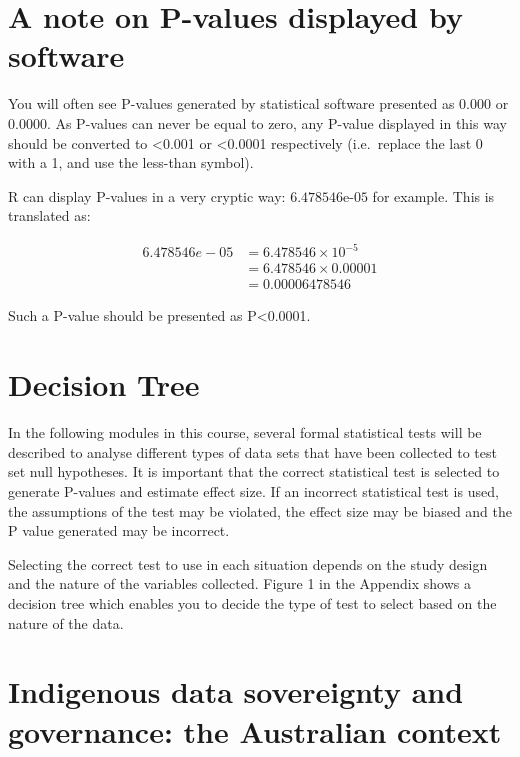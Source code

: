 \documentclass[
  a4paper,
]{memoir}
\begin{document}
\section{A note on P-values displayed by
software}\label{a-note-on-p-values-displayed-by-software}

You will often see P-values generated by statistical software presented
as 0.000 or 0.0000. As P-values can never be equal to zero, any P-value
displayed in this way should be converted to \textless0.001 or
\textless0.0001 respectively (i.e.~replace the last 0 with a 1, and use
the less-than symbol).

R can display P-values in a very cryptic way: \(\text{6.478546e-05}\)
for example. This is translated as:

\[\begin{aligned}
6.478546e-05 &= 6.478546 \times 10^{-5} \\
  &= 6.478546 \times 0.00001 \\
  &= 0.00006478546
\end{aligned}\]

Such a P-value should be presented as P\textless0.0001.

\section{Decision Tree}\label{decision-tree}

In the following modules in this course, several formal statistical
tests will be described to analyse different types of data sets that
have been collected to test set null hypotheses. It is important that
the correct statistical test is selected to generate P-values and
estimate effect size. If an incorrect statistical test is used, the
assumptions of the test may be violated, the effect size may be biased
and the P value generated may be incorrect.

Selecting the correct test to use in each situation depends on the study
design and the nature of the variables collected. Figure 1 in the
Appendix shows a decision tree which enables you to decide the type of
test to select based on the nature of the data.

\section{Indigenous data sovereignty and governance: the Australian
context}\label{indigenous-data-sovereignty-and-governance-the-australian-context}
\end{document}
